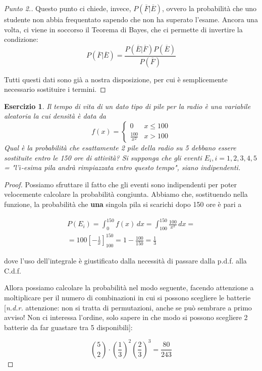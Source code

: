 \documentclass[12pt]{article}
\newtheorem{theorem}{Esercizio}
\renewcommand\qedsymbol{$\square$}
\begin{document}
\renewcommand\qedsymbol{$\blacksquare$}

\begin{proof}[Punto 2.]
	Questo punto ci chiede, invece, $P(\overline{F}|\overline{E})$, ovvero la probabilità che uno studente non abbia frequentato sapendo che non ha superato l'esame. Ancora una volta, ci viene in soccorso il Teorema di Bayes, che ci permette di invertire la condizione:
	\[
		P(\overline{F}|\overline{E}) = \frac{P(\overline{E}|\overline{F})P(\overline{E})}{P(\overline{F})}
    \]
	
	Tutti questi dati sono già a nostra disposizione, per cui è semplicemente necessario sostituire i termini.
\end{proof}

\begin{theorem}
	Il tempo di vita di un dato tipo di pile per la radio è una variabile aleatoria la cui densità è data da
	\[
		f(x) = \begin{cases} 0 & x \le 100 \\ \frac{100}{x^2} & x > 100 \end{cases}
    \]
	Qual è la probabilità che esattamente 2 pile della radio su 5 debbano essere sostituite entro le 150 ore di attività? Si supponga che gli eventi $E_i, i = 1, 2, 3, 4, 5$ = "l'$i$-esima pila andrà rimpiazzata entro questo tempo", siano indipendenti.
\end{theorem}

\begin{proof}
	Possiamo sfruttare il fatto che gli eventi sono indipendenti per poter velocemente calcolare la probabilità congiunta. 
	Abbiamo che, sostituendo nella funzione, la probabilità che \textbf{una} singola pila si scarichi dopo 150 ore è pari a

	\begin{gather*}
		P(E_i) = \int_0^{150} f(x) \,dx = \int_{100}^{150} \frac{100}{x^2} \,dx = \\
		= 100 \left[ - \frac{1}{x} \right]^{150}_{100} = 1 - \frac{100}{150} = \frac{1}{3}
	\end{gather*}

	dove l'uso dell'integrale è giustificato dalla necessità di passare dalla p.d.f. alla C.d.f.

	Allora possiamo calcolare la probabilità nel modo seguente, facendo attenzione a moltiplicare per il numero di combinazioni in cui si possono scegliere le batterie [\textit{n.d.r.} attenzione: non si tratta di permutazioni, anche se può sembrare a primo avviso! Non ci interessa l'ordine, solo sapere in che modo si possono scegliere 2 batterie da far guastare tra 5 disponibili]:

	\[
		\binom{5}{2} \cdot (\frac{1}{3})^2 (\frac{2}{3})^3 = \frac{80}{243}
	\]
\end{proof}
\end{document}
